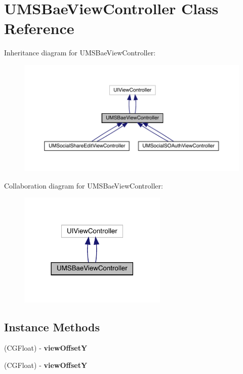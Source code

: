 \hypertarget{interface_u_m_s_bae_view_controller}{}\section{U\+M\+S\+Bae\+View\+Controller Class Reference}
\label{interface_u_m_s_bae_view_controller}


Inheritance diagram for U\+M\+S\+Bae\+View\+Controller\+:\nopagebreak
\begin{figure}[H]
\begin{center}
\leavevmode
\includegraphics[width=350pt]{interface_u_m_s_bae_view_controller__inherit__graph}
\end{center}
\end{figure}


Collaboration diagram for U\+M\+S\+Bae\+View\+Controller\+:\nopagebreak
\begin{figure}[H]
\begin{center}
\leavevmode
\includegraphics[width=201pt]{interface_u_m_s_bae_view_controller__coll__graph}
\end{center}
\end{figure}
\subsection*{Instance Methods}
\begin{DoxyCompactItemize}
\item 
\mbox{\label{interface_u_m_s_bae_view_controller_a44679961357d7b4ec217505e12a864d7}} 
(C\+G\+Float) -\/ {\bfseries view\+OffsetY}
\item 
\mbox{\label{interface_u_m_s_bae_view_controller_a44679961357d7b4ec217505e12a864d7}} 
(C\+G\+Float) -\/ {\bfseries view\+OffsetY}
\end{DoxyCompactItemize}
